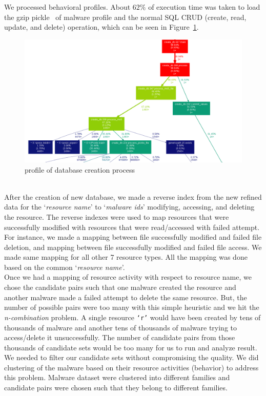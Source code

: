 We processed \gettotalmalwareii{} behavioral profiles.
About $62\%$ of execution time was taken to load the gzip pickle~\cite[]{pythonpickle} of malware profile and the normal SQL CRUD (create, read, update, and delete) operation, which can be seen in Figure~\ref{fig:dbcreation}.
\begin{figure}
\begin{center}
  \includegraphics[scale=0.4]{figures/db_create2.png}
\end{center}
\caption{profile of database creation process}
\label{fig:dbcreation}
\end{figure}
\\
After the creation of new database, we made a reverse index from the new refined data for the `\emph{resource name}' to `\emph{malware ids}' modifying, accessing, and deleting the resource.
The reverse indexes were used to map resources that were successfully modified with resources that were read/accessed with failed attempt.
For instance, we made a mapping between file successfully modified and failed file deletion, and mapping between file successfully modified and failed file access.
We made same mapping for all other 7 resource types.
All the mapping was done based on the common `\emph{resource name}'.\\

Once we had a mapping of resource activity with respect to resource name, we chose the candidate pairs such that one malware created the resource and another malware made a failed attempt to delete the same resource.
But, the number of possible pairs were too many with this simple heuristic and we hit the \emph{n-combination} problem.
A single resource \texttt{`r'} would have been created by tens of thousands of malware and another tens of thousands of malware trying to access/delete it unsuccessfully.
The number of candidate pairs from those thousands of candidate sets would be too many for us to run and analyze result.\\
We needed to filter our candidate sets without compromising the quality.
We did clustering of the malware based on their resource activities (behavior) to address this problem.
Malware dataset were clustered into different families and candidate pairs were chosen such that they belong to different families.
